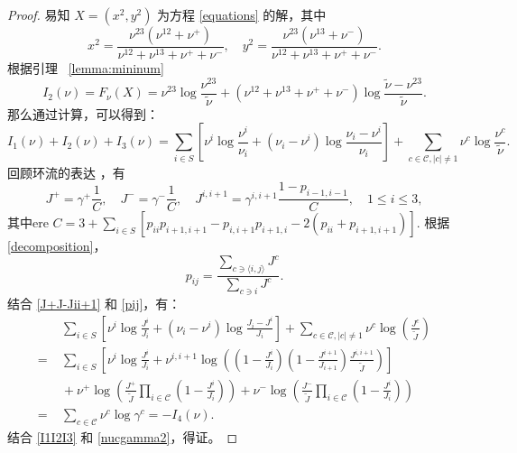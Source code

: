 \begin{proof}
	易知 $X=(x^2,y^2)$ 为方程 \eqref{equations} 的解，其中
\begin{equation*}
	x^{2}=\frac{\nu^{23}\left(\nu^{12}+\nu^+\right)}{\nu^{12}+\nu^{13}+\nu^++\nu^-},\quad y^{2}=\frac{\nu^{23}\left(\nu^{13}+\nu^-\right)}{\nu^{12}+\nu^{13}+\nu^++\nu^-}.
\end{equation*}
根据引理 ~\ref{lemma:mininum}
\begin{equation*}\label{Fnu2}
I_2(\nu)=F_{\nu}(X)=\nu^{23}\log\frac{\nu^{23}}{\tilde{\nu}}+\left(\nu^{12}+\nu^{13}+\nu^++\nu^-\right)\log\frac{\tilde{\nu}-\nu^{23}}{\tilde{\nu}}.
\end{equation*}
那么通过计算，可以得到：
\begin{equation}\label{I1I2I3}
	I_1(\nu)+I_2(\nu)+I_3(\nu) = \sum_{i\in S} \left[\nu^{i}\log \frac{\nu^{i}}{\nu_i} + (\nu_i - \nu^i)\log \frac{\nu_i - \nu^i}{\nu_i} 
	\right]
	+ \sum_{c \in \mathcal{C}, |c|\neq 1} \nu^{c} \log \frac{\nu^{c}}{\tilde{\nu}}.
\end{equation}
回顾环流的表达 \cite[Theorem.1.3.3]{jiang2004mathematical}，有
\begin{equation}\label{J+J-Jii+1}
J^+=\gamma^+\frac{1}{C},\quad J^-=\gamma^-\frac{1}{C},\quad J^{i,i+1}=\gamma^{i,i+1}\frac{1-p_{i-1,i-1}}{C}, \quad 1\le i\le 3,
\end{equation}
其中ere $C=3+\sum_{i\in S}[p_{ii}p_{i+1,i+1}-p_{i,i+1}p_{i+1,i}-2(p_{ii}+p_{i+1,i+1})]$. 根据 \eqref{decomposition}，
\begin{equation}\label{pij}
	p_{ij}=\frac{\sum_{c \ni \langle i,j\rangle}J^c}{\sum_{c\ni i}J^c}.
\end{equation}
结合 \eqref{J+J-Jii+1} 和 \eqref{pij}，有：
\begin{equation}\label{nucgamma2}
	\begin{split}
		&\;\sum_{i \in S}\left[\nu^i\log\frac{J^i}{J_i}+\left(\nu_i-\nu^i\right)\log\frac{J_i-J^i}{J_i}\right]+ \sum_{c \in \mathcal{C}, |c|\neq 1} \nu^{c} \log \left(\frac{J^c}{\tilde{J}}\right)\\
		=&\;\sum_{i \in S}\left[\nu^i\log\frac{J^i}{J_i}+\nu^{i,i+1}\log\left(\left(1-\frac{J^i}{J_i}\right)\left(1-\frac{J^{i+1}}{J_{i+1}}\right)\frac{J^{i,i+1}}{\tilde{J}}\right)\right]\\
		&\;+\nu^+\log\left(\frac{J^+}{\tilde{J}}\prod_{i\in\mathcal{C}}\left(1-\frac{J^i}{J_i}\right)\right)+\nu^-\log\left(\frac{J^-}{\tilde{J}}\prod_{i\in\mathcal{C}}\left(1-\frac{J^i}{J_i}\right)\right)\\
		=&\;\sum_{c \in \mathcal{C}}\nu^c \log\gamma^c=-I_4(\nu).
	\end{split}
\end{equation}
结合 \eqref{I1I2I3} 和 \eqref{nucgamma2}，得证。
\end{proof}
